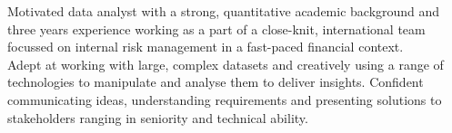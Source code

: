 \vspace{2ex}

\begin{center}
Motivated data analyst with a strong, quantitative academic background and three years experience working as a part of a close-knit, international team focussed on internal risk management in a fast-paced financial context.
\\
\vspace{1ex} 
Adept at working with large, complex datasets and creatively using a range of technologies to manipulate and analyse them to deliver insights. Confident communicating ideas, understanding requirements and presenting solutions to stakeholders ranging in seniority and technical ability.
\end{center}
